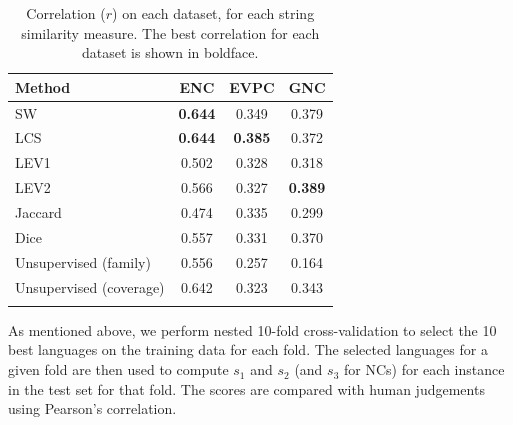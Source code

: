 \documentclass[output=paper
,modfonts
,nonflat]{langsci/langscibook}
\begin{document}

\begin{table}[t]
\begin{center}
\begin{tabular}{lccc}
\lsptoprule
Method  & ENC   & EVPC  & GNC   \\
\midrule
SW   & \textbf{0.644} & 0.349 & 0.379 \\
LCS  & \textbf{0.644} & \textbf{0.385} & 0.372 \\
LEV1 & 0.502 & 0.328 & 0.318 \\
LEV2 & 0.566 & 0.327 & \textbf{0.389} \\
Jaccard& 0.474 & 0.335 & 0.299\\
Dice & 0.557 & 0.331 & 0.370\\
\midrule
Unsupervised (family) & 0.556 & 0.257 & 0.164 \\
Unsupervised (coverage) & 0.642 & 0.323 & 0.343 \\
\lspbottomrule
\end{tabular}
\caption{Correlation ($r$) on each dataset, for
  each string similarity measure. The best correlation for each
  dataset is shown in boldface.}
\label{tab:stringsimresults}
\end{center}
\end{table}

As mentioned above, we perform nested 10-fold cross-validation to
select the 10 best languages on the training data for each fold. The
selected languages for a given fold are then used to compute $s_1$ and
$s_2$ (and $s_3$ for NCs) for each instance in the test set for that
fold.  The scores are compared with human judgements using Pearson's
correlation.  
\end{document}
